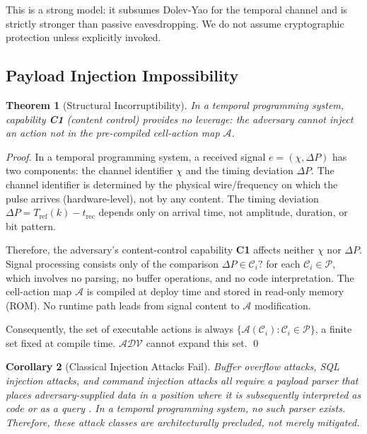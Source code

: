 \documentclass[twocolumn,10pt]{article}
\newtheorem{theorem}{Theorem}[section]
\newtheorem{corollary}[theorem]{Corollary}
\newcommand{\DP}{\Delta P}          %
\newcommand{\Tref}{T_{\mathrm{ref}}}
\newcommand{\trec}{t_{\mathrm{rec}}}
\newcommand{\calC}{\mathcal{C}}     %
\newcommand{\calP}{\mathcal{P}}     %
\begin{document}
This is a strong model: it subsumes Dolev-Yao for the temporal channel
and is strictly stronger than passive eavesdropping. We do not assume
cryptographic protection unless explicitly invoked.

\subsection{Payload Injection Impossibility}

\begin{theorem}[Structural Incorruptibility]
\label{thm:nopayload}
In a temporal programming system, capability \textbf{C1} (content
control) provides no leverage: the adversary cannot inject an action
not in the pre-compiled cell-action map $\mathcal{A}$.
\end{theorem}
\begin{proof}
In a temporal programming system, a received signal $e = (\chi, \DP)$
has two components: the channel identifier $\chi$ and the timing
deviation $\DP$. The channel identifier is determined by the physical
wire/frequency on which the pulse arrives (hardware-level), not by any
content. The timing deviation $\DP = \Tref(k) - \trec$ depends only
on arrival time, not amplitude, duration, or bit pattern.

Therefore, the adversary's content-control capability \textbf{C1}
affects neither $\chi$ nor $\DP$. Signal processing consists only of
the comparison $\DP \in \calC_i?$ for each $\calC_i \in \calP$, which
involves no parsing, no buffer operations, and no code interpretation.
The cell-action map $\mathcal{A}$ is compiled at deploy time and
stored in read-only memory (ROM). No runtime path leads from signal
content to $\mathcal{A}$ modification.

Consequently, the set of executable actions is always
$\{\mathcal{A}(\calC_i) : \calC_i \in \calP\}$, a finite set fixed
at compile time. $\mathcal{ADV}$ cannot expand this set.
\qed
\end{proof}

\begin{corollary}[Classical Injection Attacks Fail]
\label{cor:noinjection}
Buffer overflow attacks, SQL injection attacks, and command injection
attacks all require a payload parser that places adversary-supplied
data in a position where it is subsequently interpreted as code or
as a query \cite{saltzer1975protection}. In a temporal programming
system, no such parser exists. Therefore, these attack classes are
architecturally precluded, not merely mitigated.
\end{corollary}
\end{document}
